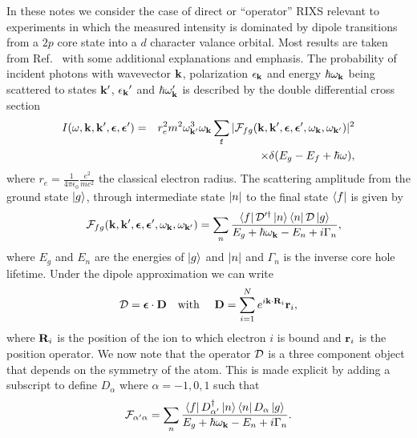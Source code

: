 \documentclass[aps,onecolumn, notitlepage, longbibliography]{revtex4-1}
\begin{document}
In these notes we consider the case of direct or ``operator'' RIXS relevant to experiments in which the measured intensity is dominated by dipole transitions from a $2p$ core state into a $d$ character valance orbital. Most results are taken from Ref.~\cite{Ament2011} with some additional explanations and emphasis. The probability of incident photons with wavevector ${\bf k}$, polarization ${\bf \epsilon_k}$ and energy $\hbar \omega_{\bf k}$ being scattered to states ${\bf k}^\prime$, ${\bf \epsilon_k}^\prime$ and $\hbar \omega_{\bf k}^\prime$ is described by the double differential cross section
\begin{eqnarray}
I(\omega,{\bf k},{\bf k}',{\bm \epsilon},{\bm \epsilon}') &=& r_e^2m^2\omega_{{\bf k}'}^3\omega_{\bf k} \sum_{\tt f}|{\cal F}_{fg}({\bf k}, {\bf k}^\prime, {\boldsymbol \epsilon}, {\boldsymbol \epsilon}^\prime, \omega_{\bf k}, \omega_{{\bf k}^\prime})|^2  \nonumber \\
&& ~~~\times  \delta (E_g-E_f+\hbar \omega) ,
\label{KramersH}
\end{eqnarray}
 where $r_e = \frac{1}{4\pi \epsilon_0} \frac{e^2}{mc^2}$ the classical electron radius. The scattering amplitude from the ground state $\left|{g}\right>$, through intermediate state $\left|{n}\right|$ to the final state $\left<{f}\right|$ is given by
\begin{eqnarray}
&& {\cal F}_{fg}({\bf k}, {\bf k}^\prime, {\boldsymbol \epsilon}, {\boldsymbol \epsilon}^\prime, \omega_{\bf k}, \omega_{{\bf k}^\prime}) =  \sum_n
	 \frac{\left<{f}\right| {\cal D}'^\dagger  \left|{n}\right> \left<{n}\right| {\cal D} \left|{g}\right>}{E_g+\hbar \omega_{\bf k}-E_n+i\Gamma_n},
\label{eq:K-H}
\end{eqnarray}
where $E_g$ and $E_n$ are the energies of $\left|{g}\right>$ and $\left|{n}\right|$ and $\Gamma_n$ is the inverse core hole lifetime. Under the dipole approximation we can write
\begin{equation}
  {\cal D}={\boldsymbol \epsilon} \cdot {\bf D} ~~~{\rm with} ~~~~
 {\bf D}= \sum_{i=1}^N e^{i{\bf k} \cdot {\bf R}_i} {\bf r}_i,
 \label{eq:transoper}
\end{equation}
where ${\bf R}_i$ is the position of the ion to which electron $i$ is bound and ${\bf r}_i$ is the position operator. We now note that the operator ${\cal D}$ is a three component object that depends on the symmetry of the atom. This is made explicit by adding a subscript to define $D_\alpha$ where $\alpha=-1,0,1$ such that
\begin{equation}
 {\cal F}_{\alpha^\prime\alpha} =  \sum_n
	 \frac{\left<{f}\right| D_{\alpha^\prime}^\dagger  \left|{n}\right> \left<{n}\right| D_\alpha \left|{g}\right>}{E_g+\hbar \omega_{\bf k}-E_n+i\Gamma_n}.
\label{Falphaalpha}
\end{equation}
\end{document}
